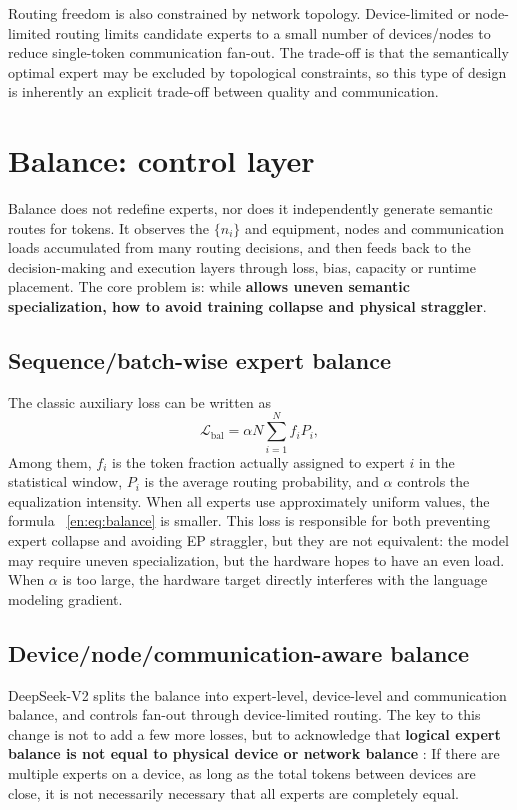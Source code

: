 \documentclass[10pt,a4paper,fontset=none]{ctexart}
\newcommand{\term}[1]{\textbf{#1}}
\begin{document}
Routing freedom is also constrained by network topology. Device-limited or node-limited routing limits candidate experts to a small number of devices/nodes to reduce single-token communication fan-out. The trade-off is that the semantically optimal expert may be excluded by topological constraints, so this type of design is inherently an explicit trade-off between quality and communication.

\section{Balance: control layer}

Balance does not redefine experts, nor does it independently generate semantic routes for tokens. It observes the $\{n_i\}$ and equipment, nodes and communication loads accumulated from many routing decisions, and then feeds back to the decision-making and execution layers through loss, bias, capacity or runtime placement. The core problem is: while \term{ allows uneven semantic specialization, how to avoid training collapse and physical straggler}.

\subsection{Sequence/batch-wise expert balance}

The classic auxiliary loss can be written as
\begin{equation}
  \mathcal{L}_{\mathrm{bal}}=\alpha N\sum_{i=1}^{N} f_i P_i,
  \label{en:eq:balance}
\end{equation}
Among them, $f_i$ is the token fraction actually assigned to expert $i$ in the statistical window, $P_i$ is the average routing probability, and $\alpha$ controls the equalization intensity. When all experts use approximately uniform values, the formula ~\eqref{en:eq:balance} is smaller. This loss is responsible for both preventing expert collapse and avoiding EP straggler, but they are not equivalent: the model may require uneven specialization, but the hardware hopes to have an even load. When $\alpha$ is too large, the hardware target directly interferes with the language modeling gradient.

\subsection{Device/node/communication-aware balance}

DeepSeek-V2 splits the balance into expert-level, device-level and communication balance, and controls fan-out\cite{en:deepseekv2} through device-limited routing. The key to this change is not to add a few more losses, but to acknowledge that \term{ logical expert balance is not equal to physical device or network balance }: If there are multiple experts on a device, as long as the total tokens between devices are close, it is not necessarily necessary that all experts are completely equal.
\end{document}

